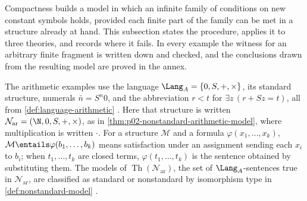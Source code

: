 Compactness builds a model in which an infinite family of conditions on new
constant symbols holds, provided each finite part of the family can be met in
a structure already at hand.  This subsection states the procedure, applies
it to three theories, and records where it fails.  In every example the
witness for an arbitrary finite fragment is written down and checked, and the
conclusions drawn from the resulting model are proved in the annex.

The arithmetic examples use the language
\(\Lang_A=\{0,S,+,\times\}\), its standard structure, numerals
\(\bar n=S^n0\), and the abbreviation \(r<t\) for
\(\exists z\,(r+Sz=t)\), all from \cref{def:language-arithmetic}
\cite[lines 8306--8438]{FrozenFormalLogicCompactnessApplications}.  Here that
structure is written \(\mathcal N_{\mathrm{ar}}=(\N,0,S,+,\times)\), as in
\cref{thm:p02-nonstandard-arithmetic-model}, where multiplication is written
\(\cdot\).  For a structure \(\mathcal M\) and a formula
\(\varphi(x_1,\ldots,x_k)\), \(\mathcal M\entails\varphi(b_1,\ldots,b_k)\)
means satisfaction under an assignment sending each \(x_i\) to \(b_i\); when
\(t_1,\ldots,t_k\) are closed terms, \(\varphi(t_1,\ldots,t_k)\) is the
sentence obtained by substituting them.  The models of
\(\operatorname{Th}(\mathcal N_{\mathrm{ar}})\), the set of
\(\Lang_A\)-sentences true in \(\mathcal N_{\mathrm{ar}}\), are classified as
standard or nonstandard by isomorphism type in \cref{def:nonstandard-model}
\cite[lines 9188--9261]{FrozenFormalLogicCompactnessApplications}.

